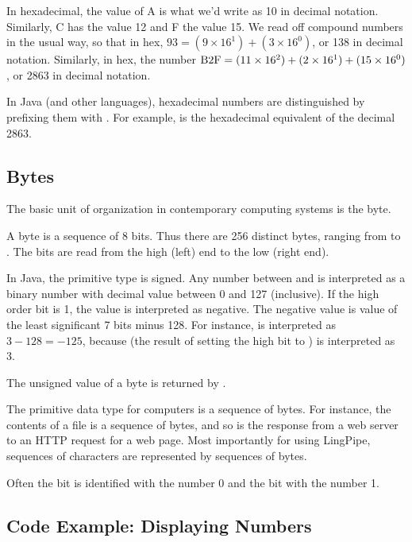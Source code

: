 
In hexadecimal, the value of A is what we'd write as 10 in decimal
notation.  Similarly, C has the value 12 and F the value 15.  We read
off compound numbers in the usual way, so that in hex, $93 = (9 \times
16^1) + (3 \times 16^0)$, or 138 in decimal notation.  Similarly, in
hex, the number $\mbox{\rm B2F} = (11 \times 16^2) + (2 \times 16^1) + (15 \times
16^0)$, or 2863 in decimal notation.

In Java (and other languages), hexadecimal numbers are distinguished
by prefixing them with .  For example,
 is the hexadecimal equivalent of the decimal 2863.

\subsection{Bytes}

The basic unit of organization in contemporary computing systems is
the byte.  

A byte is a sequence of 8 bits.  Thus there are 256
distinct bytes, ranging from  to .  The
bits are read from the high (left) end to the low (right end).

In Java, the  primitive type is signed.  Any number between
 and  is interpreted as a binary number
with decimal value between 0 and 127 (inclusive).  If the high order
bit is 1, the value is interpreted as negative.  The negative value is
value of the least significant 7 bits minus 128.  For instance,
 is interpreted as $3 - 128 = -125$, because
 (the result of setting the high bit to ) is interpreted as 3.

The unsigned value of a byte  is returned by .  

The primitive data type for computers is a sequence of bytes.  For
instance, the contents of a file is a sequence of bytes, and so
is the response from a web server to an HTTP request for a web page.
Most importantly for using LingPipe, sequences of characters are
represented by sequences of bytes.

Often the bit  is identified with the number 0
and the bit  with the number 1.  

\subsection{Code Example: Displaying Numbers}

